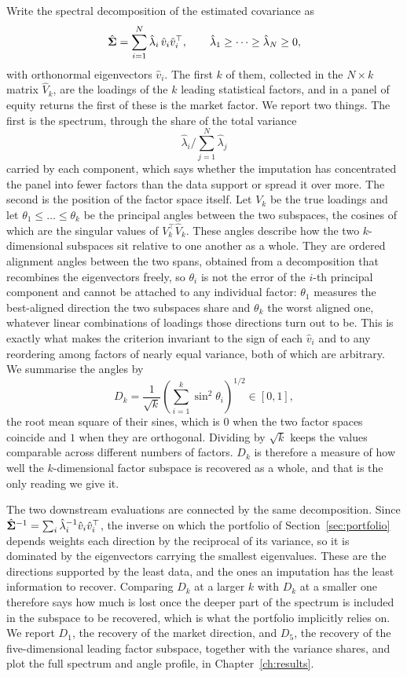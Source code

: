 Write the spectral decomposition of the estimated covariance as
\[
\hat{\boldsymbol{\Sigma}} = \sum_{i=1}^{N} \hat\lambda_i\, \hat v_i \hat v_i^\top ,
\qquad
\hat\lambda_1 \ge \dots \ge \hat\lambda_N \ge 0 ,
\]
with orthonormal eigenvectors $\hat v_i$. The first $k$ of them, collected in
the $N \times k$ matrix $\hat V_k$, are the loadings of the $k$ leading
statistical factors, and in a panel of equity returns the first of these is the
market factor. We report two things. The first is the spectrum, through the
share of the total variance
\[
\hat\lambda_i \Big/ \sum_{j=1}^{N} \hat\lambda_j
\]
carried by each component, which says whether the imputation has concentrated
the panel into fewer factors than the data support or spread it over more. The
second is the position of the factor space itself. Let $V_k$ be the true
loadings and let $\theta_1 \le \dots \le \theta_k$ be the principal angles
between the two subspaces, the cosines of which are the singular values of
$V_k^\top \hat V_k$. These angles describe how the two $k$-dimensional subspaces
sit relative to one another as a whole. They are ordered alignment angles between
the two spans, obtained from a decomposition that recombines the eigenvectors
freely, so $\theta_i$ is not the error of the $i$-th principal component and
cannot be attached to any individual factor: $\theta_1$ measures the
best-aligned direction the two subspaces share and $\theta_k$ the worst aligned
one, whatever linear combinations of loadings those directions turn out to be.
This is exactly what makes the criterion invariant to the sign of each
$\hat v_i$ and to any reordering among factors of nearly equal variance, both of
which are arbitrary. We summarise the angles by
\[
D_k = \frac{1}{\sqrt{k}}
      \left( \sum_{i=1}^{k} \sin^2 \theta_i \right)^{1/2} \in [0,1] ,
\]
the root mean square of their sines, which is $0$ when the two factor spaces
coincide and $1$ when they are orthogonal. Dividing by $\sqrt{k}$ keeps the
values comparable across different numbers of factors. $D_k$ is therefore a
measure of how well the $k$-dimensional factor subspace is recovered as a whole,
and that is the only reading we give it.

The two downstream evaluations are connected by the same decomposition. Since
$\hat{\boldsymbol{\Sigma}}^{-1} = \sum_i \hat\lambda_i^{-1} \hat v_i \hat v_i^\top$, the
inverse on which the portfolio of Section~\ref{sec:portfolio} depends weights
each direction by the reciprocal of its variance, so it is dominated by the
eigenvectors carrying the smallest eigenvalues. These are the directions
supported by the least data, and the ones an imputation has the least
information to recover. Comparing $D_k$ at a larger $k$ with $D_k$ at a smaller
one therefore says how much is lost once the deeper part of the spectrum is
included in the subspace to be recovered, which is what the portfolio implicitly
relies on. We report $D_1$, the recovery of the market direction, and $D_5$, the
recovery of the five-dimensional leading factor subspace, together with the
variance shares, and plot the full spectrum and angle profile, in
Chapter~\ref{ch:results}.